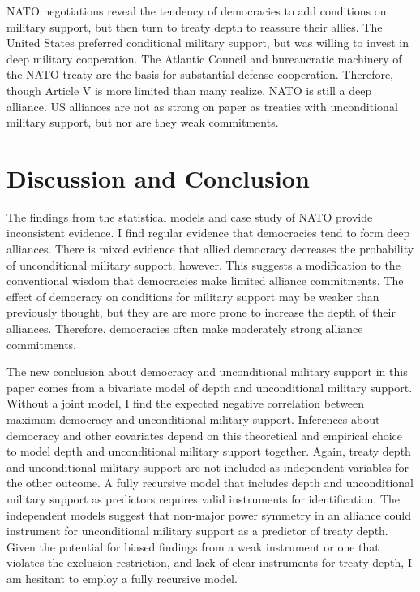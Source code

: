 \documentclass[12pt]{article}
\begin{document}
NATO negotiations reveal the tendency of democracies to add conditions on military support, but then turn to treaty depth to reassure their allies. 
The United States preferred conditional military support, but was willing to invest in deep military cooperation. 
The Atlantic Council and bureaucratic machinery of the NATO treaty are the basis for substantial defense cooperation. 
Therefore, though Article V is more limited than many realize, NATO is still a deep alliance. 
US alliances are not as strong on paper as treaties with unconditional military support, but nor are they weak commitments. 


\section{Discussion and Conclusion}


The findings from the statistical models and case study of NATO provide inconsistent evidence. 
I find regular evidence that democracies tend to form deep alliances.
There is mixed evidence that allied democracy decreases the probability of unconditional military support, however. 
This suggests a modification to the conventional wisdom that democracies make limited alliance commitments.
The effect of democracy on conditions for military support may be weaker than previously thought, but they are are more prone to increase the depth of their alliances. 
Therefore, democracies often make moderately strong alliance commitments. 


The new conclusion about democracy and unconditional military support in this paper comes from a bivariate model of depth and unconditional military support.
Without a joint model, I find the expected negative correlation between maximum democracy and unconditional military support.  
Inferences about democracy and other covariates depend on this theoretical and empirical choice to model depth and unconditional military support together. 
Again, treaty depth and unconditional military support are not included as independent variables for the other outcome. 
A fully recursive model that includes depth and unconditional military support as predictors requires valid instruments for identification. 
The independent models suggest that non-major power symmetry in an alliance could instrument for unconditional military support as a predictor of treaty depth. 
Given the potential for biased findings from a weak instrument or one that violates the exclusion restriction, and lack of clear instruments for treaty depth, I am hesitant to employ a fully recursive model.  
\end{document}
